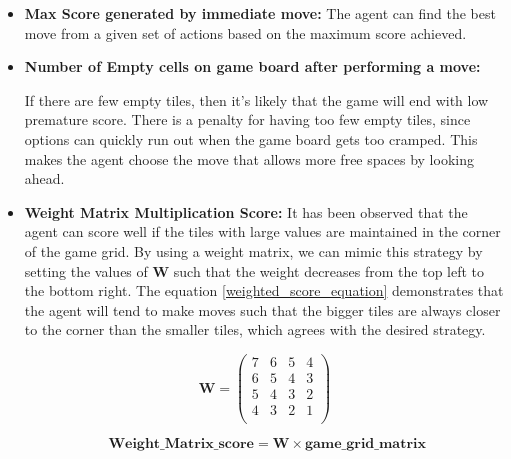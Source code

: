 \documentclass{svproc}
\begin{document}
    \begin{itemize}
        \item \textbf{{Max Score generated by immediate move:}}
        The agent can find the best move from a given set of actions based on the maximum score achieved. 


        \item {\textbf{Number of Empty cells on game board after performing a move:}}

        If there are few empty tiles, then it’s likely that the game will end with low premature score. There is a penalty for having too few empty tiles, since options can quickly run out when the game board gets too cramped. This makes the agent choose the move that allows more free spaces by looking ahead. 

        \item {\textbf{Weight Matrix Multiplication Score:}}
        It has been observed that the agent can score well if the tiles with large values are maintained in the corner of the game grid. By using a weight matrix, we can mimic this strategy by setting the values of \textbf{W} such that the weight decreases from the top left to the bottom right. The equation \ref{weighted_score_equation} demonstrates that the agent will tend to make moves such that the bigger tiles are always closer to the corner than the smaller tiles, which agrees with the desired strategy.

        \begin{equation}
            \textbf{W} =
            \begin{pmatrix}
                7 & 6 & 5 & 4 \\
                6 & 5 & 4 & 3\\
                5 & 4 & 3 & 2 \\
                4 & 3 & 2 & 1 \\
            \end{pmatrix}
        \end{equation}

        \begin{equation} \label{weighted_score_equation}
        \textbf{ Weight\_Matrix\_score} = \textbf{W} \times \textbf{game\_grid\_matrix}
        \end{equation}


\end{itemize}
\end{document}
